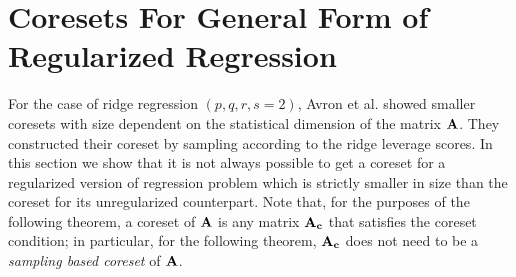\section{Coresets For General Form of Regularized Regression }
For the case of ridge regression $(p,q,r,s=2)$, Avron et al. \cite{avron2017sharper} showed smaller coresets with size dependent on the statistical dimension of the matrix $\mathbf{A}$. They constructed their coreset by sampling according to the ridge leverage scores. In this section we show that it is not always  possible to get a coreset for a regularized version of regression problem which is strictly smaller in size than the coreset for its unregularized counterpart. Note that, for the purposes of the following theorem,
a coreset of $\mathbf{A}$ is any matrix $\mathbf{A_c}$ that satisfies the coreset condition; in particular, for the following theorem, $\mathbf{A_c}$ does not need to be a {\em sampling based coreset} of $\mathbf{A}$. 

